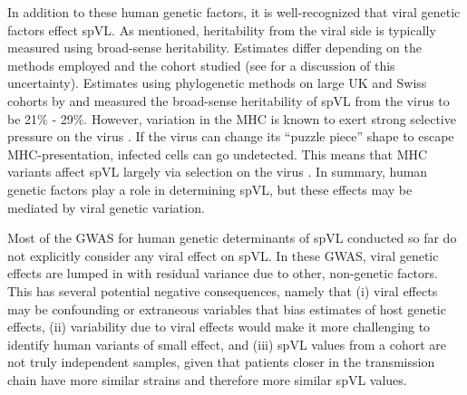 \documentclass[]{article}
\begin{document}
\begin{doublespace}
In addition to these human genetic factors, it is well-recognized that viral genetic factors effect spVL. As mentioned, heritability from the viral side is typically measured using broad-sense heritability. Estimates differ depending on the methods employed and the cohort studied (see \citet{Mitov2018} for a discussion of this uncertainty). Estimates using phylogenetic methods on large UK and Swiss cohorts by \citep{Mitov2018} and \citep{Bertels2018} measured the broad-sense heritability of spVL from the virus to be 21\% - 29\%. However, variation in the MHC is known to exert strong selective pressure on the virus \citep{Kloverpris2016, Nguyen2021}. If the virus can change its ``puzzle piece'' shape to escape MHC-presentation, infected cells can go undetected. This means that MHC variants affect spVL largely via selection on the virus \citep{Bartha2017}. In summary, human genetic factors play a role in determining spVL, but these effects may be mediated by viral genetic variation.

Most of the GWAS for human genetic determinants of spVL conducted so far \citep{Dalmasso2008, Fellay2007, Pereyra2010, Fellay2009, Pelak2010, VanManen2011, McLaren2012, McLaren2015} do not explicitly consider any viral effect on spVL. In these GWAS, viral genetic effects are lumped in with residual variance due to other, non-genetic factors. This has several potential negative consequences, namely that (i) viral effects may be confounding or extraneous variables that bias estimates of host genetic effects, (ii) variability due to viral effects would make it more challenging to identify human variants of small effect, and (iii) spVL values from a cohort are not truly independent samples, given that patients closer in the transmission chain have more similar strains and therefore more similar spVL values.


\end{doublespace}
\end{document}
